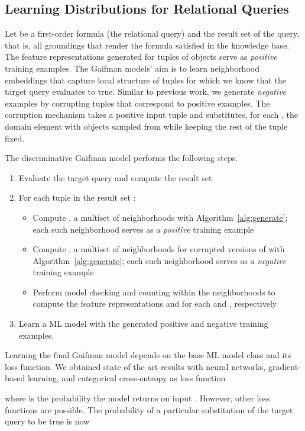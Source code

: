 \documentclass{article}
\begin{document}
\subsection{Learning Distributions for Relational Queries}

Let  be a first-order formula (the relational query) and  the result set of the  query, that is, all groundings that render the formula satisfied in the knowledge base. The feature representations generated for tuples of objects  serve as \emph{positive} training examples. The Gaifman models' aim is to learn neighborhood embeddings that capture local structure of tuples for which we know that the target query evaluates to true.  Similar to previous work, we generate \emph{negative} examples by corrupting tuples that correspond to positive examples. The corruption mechanism takes a positive input tuple  and substitutes, for each , the domain element  with objects sampled from  while keeping the rest of the tuple fixed. 

The discriminative Gaifman model performs the following steps. 
\begin{enumerate}
\item Evaluate the target query  and compute the result set 
\item For each tuple  in the result set :
\begin{itemize} 
\item Compute , a multiset of  neighborhoods  with Algorithm~\ref{alg:generate}; each such neighborhood  serves as a \emph{positive} training example
\item Compute , a multiset of  neighborhoods  for corrupted versions of  with Algorithm~\ref{alg:generate}; each such neighborhood serves as a \emph{negative} training example
\item Perform model checking and counting within the neighborhoods to compute the feature representations  and  for each  and , respectively
\end{itemize}
\item Learn a ML model with the generated positive and negative training examples.
\end{enumerate}
Learning the final Gaifman model depends on the base ML model class  and its loss function. We obtained state of the art results with neural networks, gradient-based learning, and  categorical cross-entropy as loss function


where  is the probability the model returns on input . However, other loss functions are possible. The probability of a particular substitution of the target query to be true is now
\end{document}
